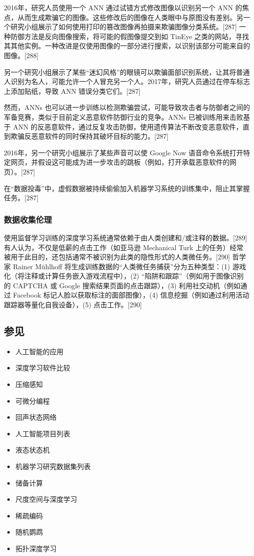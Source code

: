 2016年，研究人员使用一个 ANN 通过试错方式修改图像以识别另一个 ANN 的焦点，从而生成欺骗它的图像。这些修改后的图像在人类眼中与原图没有差别。另一个研究小组展示了如何使用打印的篡改图像再拍摄来欺骗图像分类系统。[287] 一种防御方法是反向图像搜索，将可能的假图像提交到如 TinEye 之类的网站，寻找其其他实例。一种改进是仅使用图像的一部分进行搜索，以识别该部分可能来自的图像。[288]  

另一个研究小组展示了某些“迷幻风格”的眼镜可以欺骗面部识别系统，让其将普通人识别为名人，可能允许一个人冒充另一个人。2017年，研究人员通过在停车标志上添加贴纸，导致 ANN 错误分类它们。[287]  

然而，ANNs 也可以进一步训练以检测欺骗尝试，可能导致攻击者与防御者之间的军备竞赛，类似于目前定义恶意软件防御行业的竞争。ANNs 已被训练用来击败基于 ANN 的反恶意软件，通过反复攻击防御，使用遗传算法不断改变恶意软件，直到欺骗反恶意软件的同时保持其破坏目标的能力。[287]  

2016年，另一个研究小组展示了某些声音可以使 Google Now 语音命令系统打开特定网页，并假设这可能成为进一步攻击的跳板（例如，打开承载恶意软件的网页）。[287]  

在“数据投毒”中，虚假数据被持续偷偷加入机器学习系统的训练集中，阻止其掌握任务。[287]  
\subsubsection{数据收集伦理}  
使用监督学习训练的深度学习系统通常依赖于由人类创建和/或注释的数据。[289] 有人认为，不仅是低薪的点击工作（如亚马逊 Mechanical Turk 上的任务）经常被用于此目的，还包括通常不被识别为此类的隐性形式的人类微任务。[290] 哲学家 Rainer Mühlhoff 将生成训练数据的“人类微任务捕获”分为五种类型：(1) 游戏化（将注释或计算任务嵌入游戏流程中），(2) “陷阱和跟踪”（例如用于图像识别的 CAPTCHA 或 Google 搜索结果页面的点击跟踪），(3) 利用社交动机（例如通过 Facebook 标记人脸以获取标注的面部图像），(4) 信息挖掘（例如通过利用活动跟踪器等量化自我设备），(5) 点击工作。[290]
\subsection{参见} 
\begin{itemize}
\item 人工智能的应用  
\item 深度学习软件比较  
\item 压缩感知  
\item 可微分编程  
\item 回声状态网络  
\item 人工智能项目列表  
\item 液态状态机  
\item 机器学习研究数据集列表  
\item 储备计算  
\item 尺度空间与深度学习  
\item 稀疏编码  
\item 随机鹦鹉  
\item 拓扑深度学习 
\end{itemize} 
